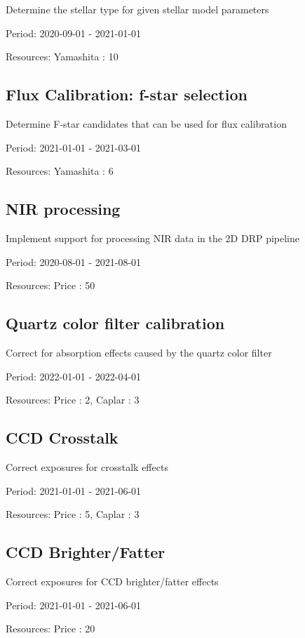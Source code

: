 Determine the stellar type for given stellar model parameters

Period: 2020-09-01 - 2021-01-01

Resources: Yamashita : 10

\subsection{Flux Calibration: f-star selection}

Determine F-star candidates that can be used for flux calibration

Period: 2021-01-01 - 2021-03-01

Resources: Yamashita : 6

\subsection{NIR processing}

Implement support for processing NIR data in the 2D DRP pipeline

Period: 2020-08-01 - 2021-08-01

Resources: Price : 50

\subsection{Quartz color filter calibration}

Correct for absorption effects caused by the quartz color filter

Period: 2022-01-01 - 2022-04-01

Resources: Price : 2, Caplar : 3

\subsection{CCD Crosstalk}

Correct exposures for crosstalk effects

Period: 2021-01-01 - 2021-06-01

Resources: Price : 5, Caplar : 3

\subsection{CCD Brighter/Fatter}

Correct exposures for CCD brighter/fatter effects

Period: 2021-01-01 - 2021-06-01

Resources: Price : 20

